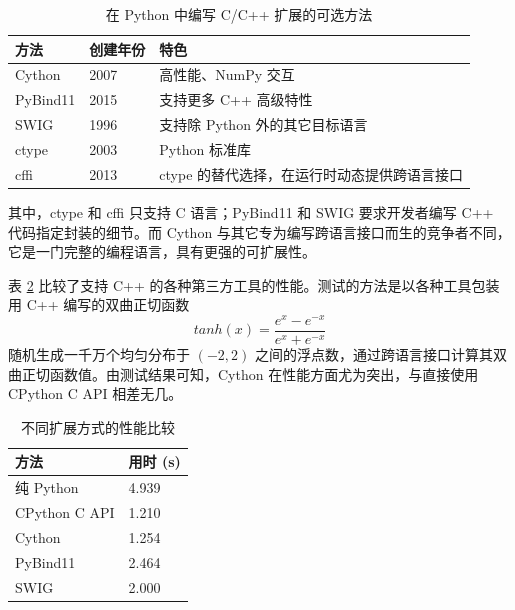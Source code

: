 \begin{table}
  \centering
  \caption{在 Python 中编写 C/C++ 扩展的可选方法}
  \begin{tabular}{lll}
    \toprule
     方法      &  创建年份  &  特色                           \\
    \midrule
     Cython    &  2007      &  高性能、NumPy 交互             \\
     PyBind11  &  2015      &  支持更多 C++ 高级特性          \\
     SWIG      &  1996      &  支持除 Python 外的其它目标语言 \\
     ctype     &  2003      &  Python 标准库                  \\
     cffi      &  2013      &  ctype 的替代选择，在运行时动态提供跨语言接口         \\
    \bottomrule
  \end{tabular}
  \label{tab:1.2}
\end{table}



其中，ctype 和 cffi 只支持 C 语言；PyBind11 和 SWIG\cite{swig} 要求开发者编写 C++ 代码指定封装的细节。而 Cython 与其它专为编写跨语言接口而生的竞争者不同，它是一门完整的编程语言，具有更强的可扩展性。

表 \ref{tab:1.3} 比较了支持 C++ 的各种第三方工具的性能。测试的方法是以各种工具包装用 C++ 编写的双曲正切函数 
\begin{equation}
    tanh(x) = \frac{e^x-e^{-x}}{e^x+e^{-x}}
\end{equation}
随机生成一千万个均匀分布于 $(-2,2)$ 之间的浮点数，通过跨语言接口计算其双曲正切函数值。由测试结果可知，Cython 在性能方面尤为突出，与直接使用 CPython C API 相差无几。

\begin{table}
  \centering
  \caption{不同扩展方式的性能比较}
  \begin{tabular}{ll}
    \toprule
     方法           &  用时 (s) \\
    \midrule
     纯 Python      &  4.939    \\
     CPython C API  &  1.210    \\
     Cython         &  1.254    \\
     PyBind11       &  2.464    \\
     SWIG           &  2.000    \\
    \bottomrule
  \end{tabular}
  \label{tab:1.3}
\end{table}

